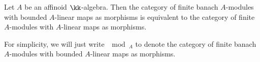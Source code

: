 





    \begin{theorem}\label{thm:equivalent_of_categroy_of_finite_banach_module_and_algebraic_module}
        Let \(A\) be an affinoid \(\kk\)-algebra.
        Then the category of finite banach \(A\)-modules with bounded \(A\)-linear maps as morphisms is equivalent to the category of finite \(A\)-modules with \(A\)-linear maps as morphisms.
    \end{theorem}

    For simplicity, we will just write \(\mod_A\) to denote the category of finite banach \(A\)-modules with bounded \(A\)-linear maps as morphisms.





